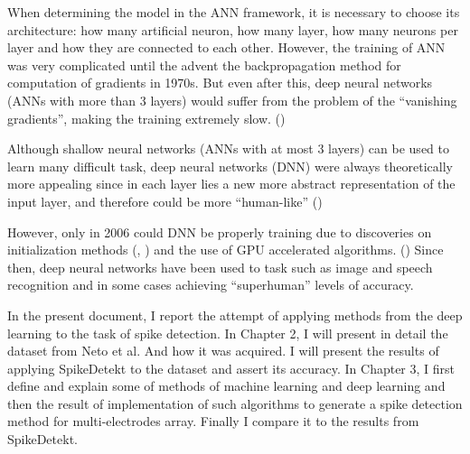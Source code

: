 When determining the model in the ANN framework, it is necessary to choose its architecture: how many artificial neuron, how many layer, how many neurons per layer and how they are connected to each other.  However, the training of ANN was very complicated until the advent the backpropagation method for computation of gradients in 1970s.  But even after this, deep neural networks (ANNs with more than 3 layers) would suffer from the problem of the “vanishing gradients”, making the training extremely slow. (\cite{hochreiter2001gradient})

Although shallow neural networks (ANNs with at most 3 layers) can be used to learn many difficult task, deep neural networks (DNN) were always theoretically more appealing since in each layer lies a new more abstract representation of the input layer, and therefore could be more “human-like” (\cite{rumelhart1988learning})

However, only in 2006 could DNN be properly training due to discoveries on initialization methods (\cite{hinton2006fast}, \cite{bengio2007greedy}) and the use of GPU accelerated algorithms. (\cite{raina2009large})
Since then, deep neural networks have been used to task such as image and speech recognition and in some cases achieving “superhuman” levels of accuracy.

In the present document, I report the attempt of applying methods from the deep learning to the task of spike detection. In Chapter 2, I will present in detail the dataset from Neto et al. And how it was acquired. I will present the results of applying SpikeDetekt to the dataset and assert its accuracy. In Chapter 3, I first define and explain some of methods of machine learning and deep learning and then the result of implementation of such algorithms to generate a spike detection method for multi-electrodes array. Finally I compare it to the results from SpikeDetekt.

